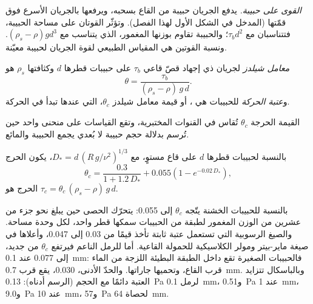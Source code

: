 \emph{القوى على حبيبة.} يدفع الجريان حبيبة من القاع بسحبه، ويرفعها بالجريان الأسرع فوق قمّتها (المدخل في الشكل الأول لهذا الفصل). وتؤثّر القوتان على مساحة الحبيبة، فتتناسبان مع $\tau_b
d^2$؛ والحبيبة تقاوم بوزنها المغمور، الذي يتناسب مع $(\rho_s - \rho) g d^3$. ونسبة القوتين هي المقياس الطبيعي لقوة الجريان لحبيبة معيّنة.

\begin{definition}\label{def:b1:erosion-transport:threshold}
\emph{معامل شيلدز} لجريان ذي إجهاد قصّ قاعي $\tau_b$ على حبيبات قطرها $d$ وكثافتها $\rho_s$ هو
\[
  \theta = \frac{\tau_b}{(\rho_s - \rho)\,g\,d}.
\]
و\emph{عتبة الحركة} للحبيبات هي ، أو قيمة معامل شيلدز $\theta_c$، التي عندها تبدأ في الحركة.
\end{definition}

القيمة الحرجة $\theta_c$ تُقاس في القنوات المختبرية، وتقع القياسات على منحنى واحد حين تُرسم بدلالة حجم حبيبة لا بُعدي يجمع الحبيبة والمائع.

\begin{proposition}\label{prop:b1:erosion-transport:soulsby}
بالنسبة لحبيبات قطرها $d$ على قاع مستوٍ، مع
$D_* = d\,\left(R\,g/\nu^2\right)^{1/3}$، يكون  الحرج
\[
  \theta_c = \frac{0.3}{1 + 1.2\,D_*} + 0.055\left(1 - e^{-0.02\,D_*}\right),
\]
 الحرج هو $\tau_c = \theta_c\,(\rho_s - \rho)\,g\,d$.
\end{proposition}
\admitted

بالنسبة للحبيبات الخشنة يتّجه $\theta_c$ إلى \num{0.055}: يتحرّك الحصى حين يبلغ  نحو جزء من عشرين من الوزن المغمور لطبقة من الحبيبات سمكها قطر واحد، لكل وحدة مساحة. والصيغ الرسوبية التي تستعمل عتبة ثابتة تأخذ قيمًا من \num{0.03} إلى \num{0.047}، وأعلاها في صيغة ماير-بيتر ومولر الكلاسيكية للحمولة القاعية. أما للرمل الناعم فيرتفع $\theta_c$ من جديد، إلى \num{0.077} عند \qty{0.1}{mm}: فالحبيبات الصغيرة تقع داخل الطبقة البطيئة اللزجة من الماء قرب القاع، وتحميها جاراتها. والحدّ الأدنى، \num{0.030}، يقع قرب \qty{0.7}{mm}. وبالباسكال تتزايد العتبة دائمًا مع الحجم (الرسم أدناه): \qty{0.13}{Pa} لرمل \qty{0.1}{mm}، و\qty{0.51}{Pa} عند \qty{1}{mm}، و\qty{9.0}{Pa} عند \qty{10}{mm}، و\qty{57}{Pa} لحصاة \qty{64}{mm}.

